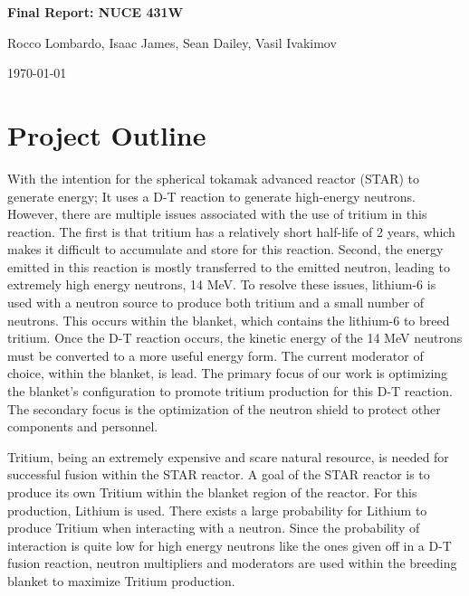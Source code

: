 \documentclass{article}
\begin{document}
\begin{titlepage}
    \centering
    \vspace*{1in}
    
    {\Large \textbf{Final Report: NUCE 431W}\par}
    \vspace{0.5in}

    {Rocco Lombardo, Isaac James, Sean Dailey, Vasil Ivakimov\par}
    \vspace{0.5in}
    
    \vfill
    {\Large \today\par}
\end{titlepage}

\section*{Project Outline}

\vspace{-5mm} \hrulefill

\bigskip

With the intention for the spherical tokamak advanced reactor (STAR) to generate energy; It uses a D-T reaction to generate high-energy neutrons. However, there are multiple issues associated with the use of tritium in this reaction. The first is that tritium has a relatively short half-life of 2 years, which makes it difficult to accumulate and store for this reaction. Second, the energy emitted in this reaction is mostly transferred to the emitted neutron, leading to extremely high energy neutrons, 14 MeV. To resolve these issues, lithium-6 is used with a neutron source to produce both tritium and a small number of neutrons. This occurs within the blanket, which contains the lithium-6 to breed tritium. Once the D-T reaction occurs, the kinetic energy of the 14 MeV neutrons must be converted to a more useful energy form. The current moderator of choice, within the blanket, is lead. The primary focus of our work is optimizing the blanket's configuration to promote tritium production for this D-T reaction. The secondary focus is the optimization of the neutron shield to protect other components and personnel.

\bigskip

Tritium, being an extremely expensive and scare natural resource, is needed for successful fusion within the STAR reactor. A goal of the STAR reactor is to produce its own Tritium within the blanket region of the reactor. For this production, Lithium is used. There exists a large probability for Lithium to produce Tritium when interacting with a neutron. Since the probability of interaction is quite low for high energy neutrons like the ones given off in a D-T fusion reaction, neutron multipliers and moderators are used within the breeding blanket to maximize Tritium production. 
\end{document}
